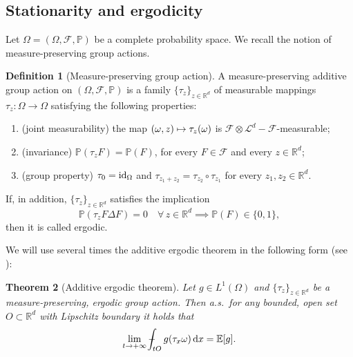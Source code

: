 \documentclass[JEP,XML,SOM,Unicode,published]{cedram}
\def\mto{\mathchoice{\longmapsto}{\mapsto}{\mapsto}{\mapsto}}
\newtheorem{theorem}{Theorem}[section]
\theoremstyle{definition}
\newtheorem{definition}[theorem]{Definition}
\def\Xint#1{\mathchoice
{\XXint\displaystyle\textstyle{#1}}%
{\XXint\textstyle\scriptstyle{#1}}%
{\XXint\scriptstyle\scriptscriptstyle{#1}}%
{\XXint\scriptscriptstyle\scriptscriptstyle{#1}}%
\!\int}
\def\XXint#1#2#3{{\setbox0=\hbox{$#1{#2#3}{\int}$ }
\vcenter{\hbox{$#2#3$ }}\kern-.57\wd0}}
\def\dashint{\Xint-}
\let\w\omega
\newcommand{\dx}{\,\mathrm{d}x}
\newcommand{\R}{\mathbb{R}}
\renewcommand{\P}{\mathbb{P}}
\newcommand{\F}{\mathcal{F}}
\begin{document}
\subsection{Stationarity and ergodicity}
Let $\Omega=(\Omega,\mathcal{F},\mathbb{P})$ be a complete probability space. We recall the notion of measure-preserving group actions.
%
\begin{definition}[Measure-preserving group action]\label{def:group-action} A measure-preserving additive group action on $(\Omega,\F,\P)$ is a family $\{\tau_z\}_{z\in\R^d}$ of measurable mappings $\tau_z:\Omega\to\Omega$ satisfying the following properties:
%
\begin{enumerate}
\item\label{joint} (joint measurability) the map $(\w,z)\mto\tau_z(\w)$ is $\mathcal{F}\otimes\mathcal{L}^d-\mathcal{F}$-measurable;
\item\label{inv} (invariance) $\P(\tau_z F)=\P(F)$, for every $F\in\F$ and every $z\in\R^d$;
\item\label{group} (group property) $\tau_0=\rm id_\Omega$ and $\tau_{z_1+z_2}=\tau_{z_2}\circ\tau_{z_1}$ for every $z_1,z_2\in\R^d$.
\end{enumerate}
%
If, in addition, $\{\tau_z\}_{z\in\R^d}$ satisfies the implication
%
\begin{equation*}
\mathbb{P}(\tau_zF\Delta F)=0\quad\forall\, z\in\R^d\implies \mathbb{P}(F)\in\{0,1\},
\end{equation*}
%
then it is called ergodic.
\end{definition}
We will use several times the additive ergodic theorem in the following form (see \cite[Prop.\,2.1]{ArSm}):
\begin{theorem}[Additive ergodic theorem]\label{thm.additiv_ergodic}
Let $g\in L^1(\Omega)$ and $\{\tau_z\}_{z\in\R^d}$ be a measure-preserving, ergodic group action. Then a.s.\ for any bounded, open set $O\subset\R^d$ with Lipschitz boundary it holds that
\begin{equation*}
\lim_{t\to +\infty}\dashint_{tO}g(\tau_x\w)\dx=\mathbb{E}[g].
\end{equation*}
\end{theorem}
%
%
\end{document}
